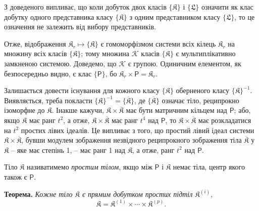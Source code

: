 \documentclass[11pt]{article}
\begin{document}
З доведеного випливає, що коли добуток двох класів \(\{\mathfrak K\}\) і \(\{\mathfrak L\}\) означити як клас добутку одного представника класу \(\{\mathfrak K\}\) з одним представником класу \(\{\mathfrak L\}\), то це означення не залежить від вибору представників.

Отже, відображення \(\mathfrak K_r\mapsto\{\mathfrak K\}\) є гомоморфізмом системи всіх кілець \(\mathfrak K_r\) на множину всіх класів \(\{\mathfrak K\}\); тому множина \(\mathscr K\) класів \(\{\mathfrak K\}\) є мультиплікативно замкненою системою. Доведемо, що \(\mathscr K\) є групою. Одиничним елементом, як безпосередньо видно, є клас \(\{\mathsf P\}\), бо \(\mathfrak K_r\times\mathsf P=\mathfrak K_r\).

Залишається довести існування для кожного класу \(\{\mathfrak K\}\) оберненого класу \(\{\mathfrak K\}^{-1}\). Виявляється, треба покласти \(\{\mathfrak K\}^{-1}=\{\overline{\mathfrak K}\}\), де \(\{\overline{\mathfrak K}\}\) означає тіло, реципрокно ізоморфне до \(\mathfrak K\). Інакше кажучи, \(\mathfrak K\times\overline{\mathfrak K}\) має бути матричним кільцем над \(\mathsf P\); або, якщо \(\mathfrak K\) має ранг \(t^2\), а отже, \(\mathfrak K\times\overline{\mathfrak K}\) має ранг \(t^4\) над \(\mathsf P\), то \(\mathfrak K\times\overline{\mathfrak K}\) має розкладатися на \(t^2\) простих лівих ідеалів. Це випливає з того, що простий лівий ідеал системи \(\mathfrak K\times\overline{\mathfrak K}\), бувши модулем зображення незвідного реципрокного зображення тіла \(\overline{\mathfrak K}\) у \(\mathfrak K\) -- яке має степінь 1, -- має ранг 1 над \(\mathfrak K\), а отже, ранг \(t^2\) над \(\mathsf P\).

Тіло \(\mathfrak K\) називатимемо \emph{простим тілом}, якщо між \(\mathsf P\) і \(\mathfrak K\) немає тіла, центр якого також є \(\mathsf P\).

\textbf{Теорема.} \emph{Кожне тіло \(\mathfrak K\) є прямим добутком простих підтіл \(\mathfrak K^{(i)}\),}
\[
\mathfrak K=\mathfrak K^{(1)}\times\cdots\times\mathfrak K^{(p)}.
\]
\end{document}
